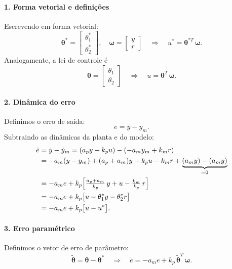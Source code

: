 \documentclass[10pt]{article}
\newcommand{\bm}[1]{\boldsymbol{#1}}
\begin{document}
\paragraph{1. Forma vetorial e definições}
Escrevendo em forma vetorial:
\begin{equation}
  \bm{\theta}^* = 
  \begin{bmatrix}
    \theta_1^* \\ \theta_2^*
  \end{bmatrix},
  \quad
  \bm{\omega} = 
  \begin{bmatrix}
    y \\ r
  \end{bmatrix}
  \quad\Longrightarrow\quad
  u^* = \bm{\theta}^{*T}\,\bm{\omega}.
\end{equation}
Analogamente, a lei de controle é
\begin{equation}
  \bm{\theta} = 
  \begin{bmatrix}
    \theta_1 \\ \theta_2
  \end{bmatrix}
  \quad\Longrightarrow\quad
  u = \bm{\theta}^T\,\bm{\omega}.
\end{equation}

\paragraph{2. Dinâmica do erro}
Definimos o erro de saída:
\begin{equation}
  e = y - y_m.
\end{equation}
Subtraindo as dinâmicas da planta e do modelo:
\begin{equation}
  \begin{aligned}
  \dot e 
  &= \dot y - \dot y_m
   = (a_p y + k_p u) - (-a_m y_m + k_m r) \\
  &= -a_m (y - y_m) + (a_p + a_m) y + k_p u - k_m r
    + \underbrace{(a_m y) - (a_m y)}_{=0} \\
  &= -a_m e
    + k_p\Bigl[\tfrac{a_p + a_m}{k_p}\,y + u - \tfrac{k_m}{k_p}\,r\Bigr] \\
  &= -a_m e + k_p \bigl[u - \theta_1^* y - \theta_2^* r\bigr] \\
  &= -a_m e + k_p \bigl[u - u^*\bigr].
  \end{aligned}
\end{equation}

\paragraph{3. Erro paramétrico}
Definimos o vetor de erro de parâmetro:
\begin{equation}
  \tilde{\bm{\theta}}
  = \bm{\theta} - \bm{\theta}^*
  \quad\Longrightarrow\quad
  \dot e = -a_m e + k_p\,\tilde{\bm{\theta}}^T\,\bm{\omega}.
\end{equation}
\end{document}
